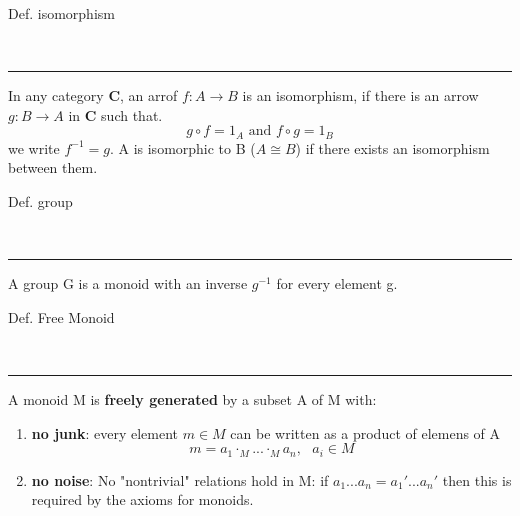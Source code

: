 \begin{note}
  \begin{field}
    Def. isomorphism
  \end{field} \\
  \noindent\rule[0.5ex]{\linewidth}{1pt}
  \begin{field}
    In any category \textbf{C}, an arrof $f: A\rightarrow B$ is an isomorphism, if there is an arrow $g: B\rightarrow A$ in \textbf{C} such that.
    \[ g\circ f = 1_A\text{ and }f\circ g = 1_B \]
    we write $f^{-1} = g$.
    A is isomorphic to B ($A\cong B$) if there exists an isomorphism between them.
  \end{field}
\end{note}

\begin{note}
  \begin{field}
    Def. group
  \end{field} \\
  \noindent\rule[0.5ex]{\linewidth}{1pt}
  \begin{field}
    A group G is a monoid with an inverse $g^{-1}$ for every element g.
  \end{field}
\end{note}

\begin{note}
  \begin{field}
    Def. Free Monoid
  \end{field} \\
  \noindent\rule[0.5ex]{\linewidth}{1pt}
  \begin{field}
    A monoid M is \textbf{freely generated} by a subset A of M with:
    \begin{enumerate}
      \item \textbf{no junk}: every element $m\in M$ can be written as a product of elemens of A\\
        \[ m = a_1 \cdot_M ... \cdot_M a_n,\ \ \ a_i\in M \]
      \item \textbf{no noise}: No "nontrivial" relations hold in M: if $a_1 ... a_n = a_1' ... a_n'$ then this is required by the axioms for monoids.
    \end{enumerate}
  \end{field}
\end{note}

